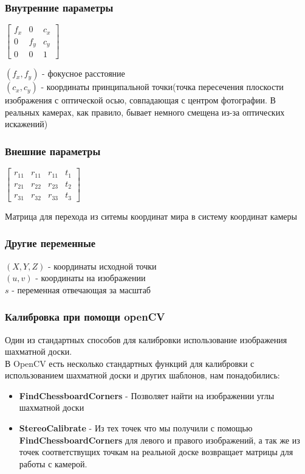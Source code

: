 \documentclass{beamer}
\begin{document}
		
		\begin{frame}
			\frametitle{Внутренние параметры}
			\begin{center}
			$
			\begin{bmatrix}
			f_{x}&0&c_{x}\\
			0&f_{y}&c_{y}\\
			0&0&1
			\end{bmatrix}
			$
			\end{center}
			$(f_{x},f_{y})$ - фокусное расстояние\\
			$(c_{x},c_{y})$ - координаты принципальной точки(точка пересечения плоскости изображения с оптической осью, совпадающая с центром фотографии. В реальных камерах, как правило, бывает немного смещена из-за оптических искажений)
		\end{frame}				
		\begin{frame}
			\frametitle{Внешние параметры}
			\begin{center}
			$
			\begin{bmatrix}
			r_{11}&r_{11}&r_{11}&t_{1}\\
			r_{21}&r_{22}&r_{23}&t_{2}\\
			r_{31}&r_{32}&r_{33}&t_{3}
			\end{bmatrix}
			$
			\end{center}
			Матрица для перехода из ситемы координат мира в систему координат камеры
		\end{frame}				
		\begin{frame}
			\frametitle{Другие переменные}
			$(X,Y,Z)$ - координаты исходной точки\\
			$(u,v)$ - координаты на изображении\\
			$s$ - переменная отвечающая за масштаб
		\end{frame}
		\begin{frame}
			\frametitle{Калибровка при помощи openCV}
			Один из стандартных способов для калибровки использование изображения шахматной доски.\\
			В OpenCV есть несколько стандартных функций для калибровки с использованием шахматной доски и других шаблонов, нам понадобились:
			\begin{itemize}
				\item \textbf{FindChessboardCorners} - Позволяет найти на изображении углы шахматной доски
				\item \textbf{StereoCalibrate} - Из тех точек что мы получили с помощью \textbf{FindChessboardCorners} для левого и правого изображений, а так же из точек соответствущих точкам на реальной доске возвращает матрицы для работы с камерой.
			\end{itemize}
		\end{frame}
\end{document}
